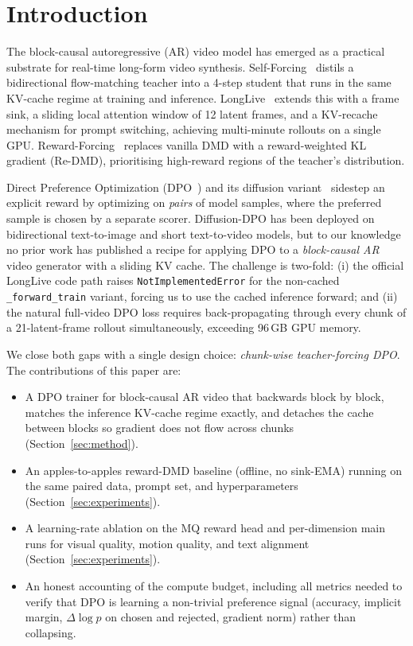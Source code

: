\documentclass{article}
\begin{document}
\begin{abstract}
\end{abstract}

\section{Introduction}
The block-causal autoregressive (AR) video model has emerged as a practical substrate for real-time long-form video synthesis. Self-Forcing~\cite{huang2025selfforcing} distils a bidirectional flow-matching teacher into a 4-step student that runs in the same KV-cache regime at training and inference. LongLive~\cite{yang2025longlive} extends this with a frame sink, a sliding local attention window of 12 latent frames, and a KV-recache mechanism for prompt switching, achieving multi-minute rollouts on a single GPU. Reward-Forcing~\cite{lu2025rewardforcing} replaces vanilla DMD with a reward-weighted KL gradient (Re-DMD), prioritising high-reward regions of the teacher's distribution.

Direct Preference Optimization (DPO~\cite{rafailov2023dpo}) and its diffusion variant~\cite{wallace2023diffusiondpo} sidestep an explicit reward by optimizing on \emph{pairs} of model samples, where the preferred sample is chosen by a separate scorer. Diffusion-DPO has been deployed on bidirectional text-to-image and short text-to-video models, but to our knowledge no prior work has published a recipe for applying DPO to a \emph{block-causal AR} video generator with a sliding KV cache. The challenge is two-fold: (i) the official LongLive code path raises \texttt{NotImplementedError} for the non-cached \texttt{\_forward\_train} variant, forcing us to use the cached inference forward; and (ii) the natural full-video DPO loss requires back-propagating through every chunk of a 21-latent-frame rollout simultaneously, exceeding 96\,GB GPU memory.

We close both gaps with a single design choice: \emph{chunk-wise teacher-forcing DPO}. The contributions of this paper are:
\begin{itemize}
\item A DPO trainer for block-causal AR video that backwards block by block, matches the inference KV-cache regime exactly, and detaches the cache between blocks so gradient does not flow across chunks (Section~\ref{sec:method}).
\item An apples-to-apples reward-DMD baseline (offline, no sink-EMA) running on the same paired data, prompt set, and hyperparameters (Section~\ref{sec:experiments}).
\item A learning-rate ablation on the MQ reward head and per-dimension main runs for visual quality, motion quality, and text alignment (Section~\ref{sec:experiments}).
\item An honest accounting of the compute budget, including all metrics needed to verify that DPO is learning a non-trivial preference signal (accuracy, implicit margin, $\Delta\log p$ on chosen and rejected, gradient norm) rather than collapsing.
\end{itemize}
\end{document}
